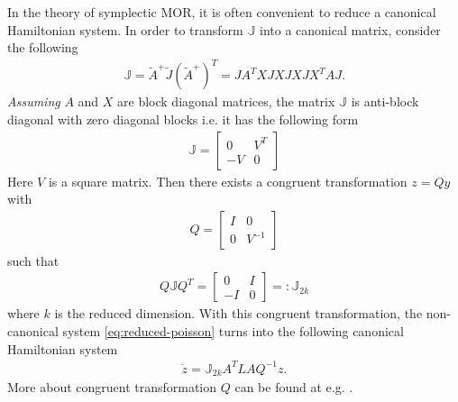 \documentclass[12pt]{article}
\begin{document}
In the theory of symplectic MOR, it is often convenient to reduce a canonical Hamiltonian system. In order to transform $\mathbb{J}$ into a canonical matrix, consider the following
\begin{align*}
\mathbb{J} = \tilde A ^+ \tilde J (\tilde A ^+)^T = J A^T X J XJXJX^TAJ.
\end{align*}
\emph{Assuming} $A$ and $X$ are block diagonal matrices, the matrix $\mathbb{J}$ is anti-block diagonal with zero diagonal blocks i.e. it has the following form
\begin{align*}
\mathbb{J} = \begin{bmatrix}
0 & V^T \\ -V & 0
\end{bmatrix}
\end{align*}
Here $V$ is a square matrix. Then there exists a congruent transformation $z = Qy$ with
\begin{align*}
Q = \begin{bmatrix}
I & 0 \\ 0 & V^{-1}
\end{bmatrix}
\end{align*}
such that
\begin{align*}
Q\mathbb{J}Q^T = \begin{bmatrix}
0 & I \\ -I & 0
\end{bmatrix} =: \mathbb{J}_{2k}
\end{align*}
where $k$ is the reduced dimension. With this congruent transformation, the non-canonical system \eqref{eq:reduced-poisson} turns into the following canonical Hamiltonian system
\begin{align}
\dot z = \mathbb{J}_{2k} A^TLAQ^{-1} z.
\end{align}
More about congruent transformation $Q$ can be found at e.g. \cite{Peng2016,Eves1980}.




\end{document}
